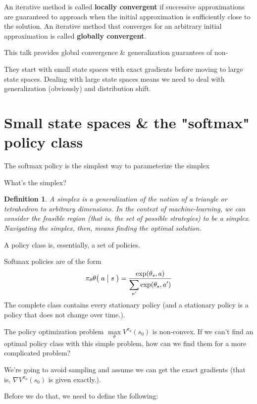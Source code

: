 \documentclass[12pt,reqno]{amsart}
\newtheorem{defn}{Definition}
\newcommand{\Cond}[2]{\bigm( {#1} \bigm\vert {#2}\bigm)}
\begin{document}
An iterative method is called \textbf{locally convergent} if successive approximations are guaranteed to approach when the initial approximation is sufficiently close to the solution. An iterative method that converges for an arbitrary initial approximation is called \textbf{globally convergent}.

This talk provides global convergence \& generalization guarantees of non-%

They start with small state spaces with exact gradients before moving to large state spaces. Dealing with large state spaces means we need to deal with generalization (obviously) and distribution shift.

\section{Small state spaces \& the "softmax" policy class}
The softmax policy is the simplest way to parameterize the simplex

What's the simplex?
\begin{shaded}
\begin{defn}
        A simplex is a generalization of the notion of a triangle or tetrahedron to arbitrary dimensions. In the context of machine-learning, we can consider the feasible region (that is, the set of possible strategies) to be a simplex. Navigating the simplex, then, means finding the optimal solution.
\end{defn}
\end{shaded}
A policy class is, essentially, a set of policies.

Softmax policies are of the form
\begin{equation}
\pi_\theta\theta{\Cond{a}{s}}=\frac{\displaystyle \exp(\theta_s,a)}{\displaystyle \sum_{a'}\exp(\theta_s,a')}
\end{equation}
The complete class contains every stationary policy (and a stationary policy is a policy that does not change over time.).

The policy optimization problem $\max\limits_{\theta} V^{\pi_{\theta}}(s_0)$ is non-convex. If we can't find an optimal policy class with this simple problem, how can we find them for a more complicated problem?

We're going to avoid sampling and assume we can get the exact gradients (that is, $\nabla V^{\pi_0}(s_0)$ is given exactly.).

Before we do that, we need to define the following:
\end{document}
